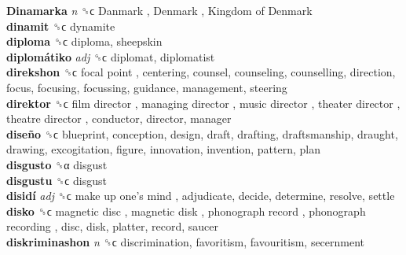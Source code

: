 \textbf{Dinamarka} \emph{n}  ␝ϲ   Danmark ,  Denmark ,  Kingdom of Denmark   \\
\textbf{dinamit} ␝ϲ  dynamite  \\
\textbf{diploma} ␝ϲ  diploma, sheepskin  \\
\textbf{diplomátiko} \emph{adj}  ␝ϲ  diplomat, diplomatist  \\
\textbf{direkshon} ␝ϲ   focal point , centering, counsel, counseling, counselling, direction, focus, focusing, focussing, guidance, management, steering  \\
\textbf{direktor} ␝ϲ   film director ,  managing director ,  music director ,  theater director ,  theatre director , conductor, director, manager  \\
\textbf{diseño} ␝ϲ  blueprint, conception, design, draft, drafting, draftsmanship, draught, drawing, excogitation, figure, innovation, invention, pattern, plan  \\
\textbf{disgusto} ␝α  disgust  \\
\textbf{disgustu} ␝ϲ  disgust  \\
\textbf{disidí} \emph{adj}  ␝ϲ   make up one’s mind , adjudicate, decide, determine, resolve, settle  \\
\textbf{disko} ␝ϲ   magnetic disc ,  magnetic disk ,  phonograph record ,  phonograph recording , disc, disk, platter, record, saucer  \\
\textbf{diskriminashon} \emph{n}  ␝ϲ  discrimination, favoritism, favouritism, secernment  \\
